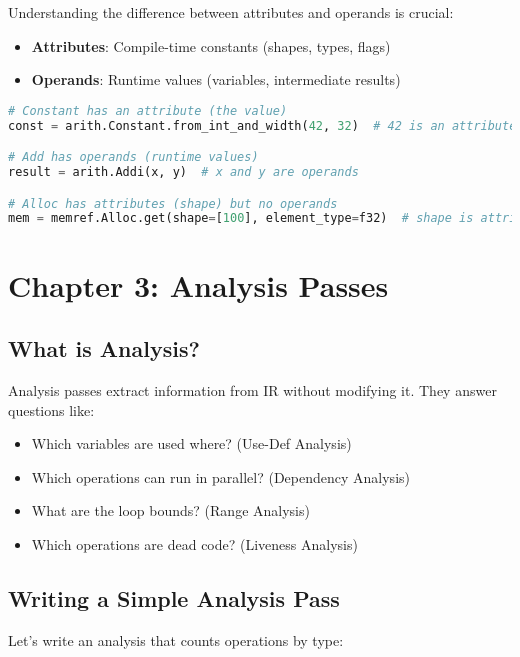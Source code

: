 \documentclass[11pt,a4paper]{article}
\begin{document}
Understanding the difference between attributes and operands is crucial:

\begin{itemize}
    \item \textbf{Attributes}: Compile-time constants (shapes, types, flags)
    \item \textbf{Operands}: Runtime values (variables, intermediate results)
\end{itemize}

\begin{lstlisting}[language=Python, caption=Attributes vs Operands]
# Constant has an attribute (the value)
const = arith.Constant.from_int_and_width(42, 32)  # 42 is an attribute

# Add has operands (runtime values)
result = arith.Addi(x, y)  # x and y are operands

# Alloc has attributes (shape) but no operands
mem = memref.Alloc.get(shape=[100], element_type=f32)  # shape is attribute
\end{lstlisting}

\section{Chapter 3: Analysis Passes}

\subsection{What is Analysis?}

Analysis passes extract information from IR without modifying it. They answer questions like:
\begin{itemize}
    \item Which variables are used where? (Use-Def Analysis)
    \item Which operations can run in parallel? (Dependency Analysis)
    \item What are the loop bounds? (Range Analysis)
    \item Which operations are dead code? (Liveness Analysis)
\end{itemize}

\subsection{Writing a Simple Analysis Pass}

Let's write an analysis that counts operations by type:
\end{document}
